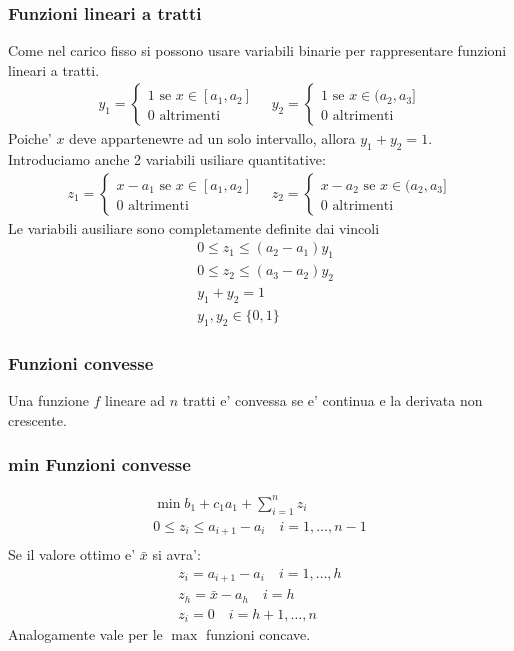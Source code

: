 \documentclass[a4paper,12pt]{article}
\begin{document}
\subsubsection*{Funzioni lineari a tratti}
Come nel carico fisso si possono usare variabili binarie per rappresentare funzioni lineari a tratti.\\
\begin{align*}
  y_1 = \begin{cases}
    1 \text{ se $x \in [a_1, a_2]$}\\
    0 \text{ altrimenti}
  \end{cases} \quad y_2 = \begin{cases}
    1 \text{ se $x \in (a_2, a_3]$}\\
    0 \text{ altrimenti}
    \end{cases}
\end{align*}
Poiche' $x$ deve appartenewre ad un solo intervallo, allora $y_1 + y_2 = 1$.\\
Introduciamo anche 2 variabili usiliare quantitative:
\begin{align*}
  z_1 = \begin{cases}
    x-a_1 \text{ se $x \in [a_1, a_2]$}\\
    0 \text{ altrimenti}
  \end{cases} \quad z_2 = \begin{cases}
    x-a_2 \text{ se $x \in (a_2, a_3]$}\\
    0 \text{ altrimenti}
  \end{cases}
\end{align*}
Le variabili ausiliare sono completamente definite dai vincoli
\begin{align*}
  & 0 \leq z_1 \leq (a_2 - a_1) y_1 \\
  & 0 \leq z_2 \leq (a_3 - a_2) y_2 \\
  & y_1 + y_2 = 1 \\
  & y_1, y_2 \in \{0,1\}
\end{align*}
\subsubsection*{Funzioni convesse}
Una funzione $f$ lineare ad $n$ tratti e' convessa se e' continua e la derivata non crescente.\\
\subsubsection{min Funzioni convesse}
\begin{align*}
  \min b_1 + c_1 a_1 + \sum_{i=1}^n z_i\\
  0 \leq z_i \leq a_{i+1} - a_i \quad i=1,\dots,n-1\\
\end{align*}
Se il valore ottimo e' $\bar{x}$ si avra':
\begin{align*}
  z_i = a_{i+1} - a_i \quad i=1,\dots,h\\
  z_h = \bar{x} - a_h \quad i=h\\
  z_i = 0 \quad i=h+1,\dots,n
\end{align*}
Analogamente vale per le $\max$ funzioni concave.
\end{document}
